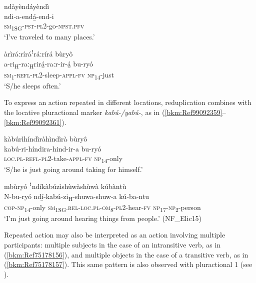 \ea
\glll ndàyèndáyèndì\\
ndi-a-endá̲-end-i\\
\textsc{sm}\textsubscript{1SG}-\textsc{pst}-\textsc{pl}2-go-\textsc{npst}.\textsc{pfv}\\
\glt ‘I’ve traveled to many places.’
\z

\ea
\label{bkm:Ref75178011}
àrìráːríráꜝráːrírá bùryô\\
\gll a-ri\textsubscript{H}-raː\textsubscript{H}rirá̲-raːr-ir-á̲    bu-ryó\\
\textsc{sm}\textsubscript{1}-\textsc{refl}-\textsc{pl}2-sleep-\textsc{appl}-\textsc{fv}  \textsc{np}\textsubscript{14}-just\\
\glt ‘S/he sleeps often.’
\z

To express an action repeated in different locations, reduplication combines with the locative pluractional marker \textit{\-kabú-/yabú-}, as in (\ref{bkm:Ref99092359}--\ref{bkm:Ref99092361}).

\ea
\label{bkm:Ref99092359}
kàbúrìhíndìràhìndìrà bùryô\\
\gll kabú-ri-híndira-hind-ir-a    bu-ryó\\
\textsc{loc}.\textsc{pl}-\textsc{refl}-\textsc{pl}2-take-\textsc{appl}-\textsc{fv}  \textsc{np}\textsubscript{14}-only\\
\glt ‘S/he is just going around taking for himself.’
\z

\ea
\label{bkm:Ref99092361}
mbùryó ꜝndíkàbúzìshùwàshùwà kúbàntù\\
\gll N-bu-ryó    ndí̲-kabú-zi\textsubscript{H}-shuwa-shuw-a    kú-ba-ntu\\
\textsc{cop}-\textsc{np}\textsubscript{14}-only  \textsc{sm}\textsubscript{1SG}.\textsc{rel}-\textsc{loc}.\textsc{pl}-\textsc{om}\textsubscript{8}-\textsc{pl}2-hear-\textsc{fv}  \textsc{np}\textsubscript{17}-\textsc{np}\textsubscript{2}-person\\
\glt ‘I’m just going around hearing things from people.’ (NF\_Elic15)
\z

Repeated action may also be interpreted as an action involving multiple participants: multiple subjects in the case of an intransitive verb, as in (\ref{bkm:Ref75178156}), and multiple objects in the case of a transitive verb, as in (\ref{bkm:Ref75178157}). This same pattern is also observed with pluractional 1 (see ).

